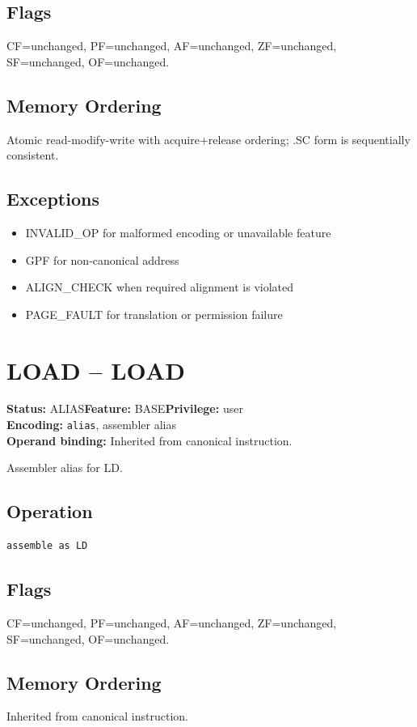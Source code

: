 \documentclass[10pt]{article}
\begin{document}
\subsection*{Flags}
CF=unchanged, PF=unchanged, AF=unchanged, ZF=unchanged, SF=unchanged, OF=unchanged.
\subsection*{Memory Ordering}
Atomic read-modify-write with acquire+release ordering; .SC form is sequentially consistent.
\subsection*{Exceptions}
\begin{itemize}
\item INVALID\_OP for malformed encoding or unavailable feature
\item GPF for non-canonical address
\item ALIGN\_CHECK when required alignment is violated
\item PAGE\_FAULT for translation or permission failure
\end{itemize}
\clearpage

\section{LOAD -- LOAD}
\textbf{Status:} ALIAS\quad \textbf{Feature:} BASE\quad \textbf{Privilege:} user\\
\textbf{Encoding:} \texttt{alias}, assembler alias\\
\textbf{Operand binding:} Inherited from canonical instruction.

Assembler alias for LD.

\subsection*{Operation}
\begin{lstlisting}
assemble as LD
\end{lstlisting}
\subsection*{Flags}
CF=unchanged, PF=unchanged, AF=unchanged, ZF=unchanged, SF=unchanged, OF=unchanged.
\subsection*{Memory Ordering}
Inherited from canonical instruction.
\end{document}
